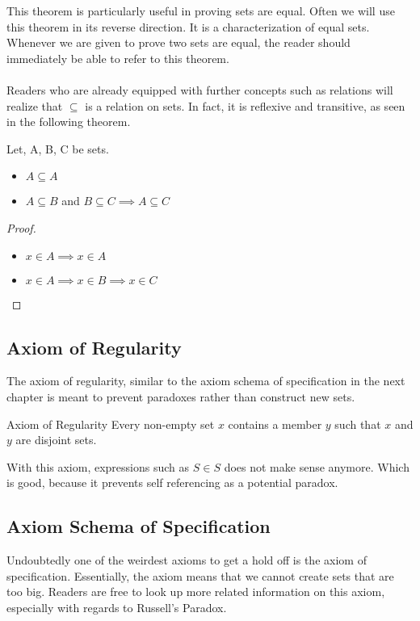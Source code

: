 This theorem is particularly useful in proving sets are equal. Often we will use this theorem in its reverse direction. It is a characterization of equal sets. Whenever we are given to prove two sets are equal, the reader should immediately be able to refer to this theorem. \\~\\
Readers who are already equipped with further concepts such as relations will realize that $\subseteq$ is a relation on sets. In fact, it is reflexive and transitive, as seen in the following theorem. 
\begin{thm}{}{} Let, A, B, C be sets. 
\begin{itemize}
\item $A\subseteq A$
\item $A\subseteq B$ and $B\subseteq C\implies A\subseteq C$
\end{itemize}\tcbline
\begin{proof}~\\
\begin{itemize}
\item $x\in A\implies x\in A$
\item $x\in A\implies x\in B\implies x\in C$
\end{itemize}
\end{proof}
\end{thm}

\subsection{Axiom of Regularity}
The axiom of regularity, similar to the axiom schema of specification in the next chapter is meant to prevent paradoxes rather than construct new sets. 

\begin{axm}{Axiom of Regularity}{} Every non-empty set $x$ contains a member $y$ such that $x$ and $y$ are disjoint sets. 
\end{axm}

With this axiom, expressions such as $S\in S$ does not make sense anymore. Which is good, because it prevents self referencing as a potential paradox. 

\subsection{Axiom Schema of Specification}
Undoubtedly one of the weirdest axioms to get a hold off is the axiom of specification. Essentially, the axiom means that we cannot create sets that are too big. Readers are free to look up more related information on this axiom, especially with regards to Russell's Paradox. 

